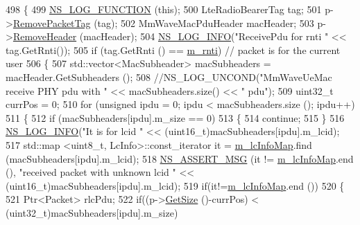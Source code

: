 \begin{DoxyCode}
498 \{
499         \hyperlink{log-macros-disabled_8h_a90b90d5bad1f39cb1b64923ea94c0761}{NS\_LOG\_FUNCTION} (\textcolor{keyword}{this});
500         LteRadioBearerTag tag;
501         p->\hyperlink{classns3_1_1Packet_a078fe922d976a417ab25ba2f3c2fd667}{RemovePacketTag} (tag);
502         MmWaveMacPduHeader macHeader;
503         p->\hyperlink{classns3_1_1Packet_a0961eccf975d75f902d40956c93ba63e}{RemoveHeader} (macHeader);
504   \hyperlink{group__logging_gafbd73ee2cf9f26b319f49086d8e860fb}{NS\_LOG\_INFO}(\textcolor{stringliteral}{"ReceivePdu for rnti "} << tag.GetRnti());
505         \textcolor{keywordflow}{if} (tag.GetRnti () == \hyperlink{classns3_1_1MmWaveUeMac_a73d6bc08e75e3a20c5fbaf3113cf40f5}{m\_rnti}) \textcolor{comment}{// packet is for the current user}
506         \{
507                 std::vector<MacSubheader> macSubheaders = macHeader.GetSubheaders ();
508                 \textcolor{comment}{//NS\_LOG\_UNCOND("MmWaveUeMac receive PHY pdu with " << macSubheaders.size() << " pdu");}
509                 uint32\_t currPos = 0;
510                 \textcolor{keywordflow}{for} (\textcolor{keywordtype}{unsigned} ipdu = 0; ipdu < macSubheaders.size (); ipdu++)
511                 \{
512                         \textcolor{keywordflow}{if} (macSubheaders[ipdu].m\_size == 0)
513                         \{
514                                 \textcolor{keywordflow}{continue};
515                         \}
516                         \hyperlink{group__logging_gafbd73ee2cf9f26b319f49086d8e860fb}{NS\_LOG\_INFO}(\textcolor{stringliteral}{"It is for lcid "} << (uint16\_t)macSubheaders[ipdu].m\_lcid);
517                         std::map <uint8\_t, LcInfo>::const\_iterator it = 
      \hyperlink{classns3_1_1MmWaveUeMac_a0797806054f43d23d0635440bcef7350}{m\_lcInfoMap}.find (macSubheaders[ipdu].m\_lcid);
518                         \hyperlink{assert_8h_aff5ece9066c74e681e74999856f08539}{NS\_ASSERT\_MSG} (it != \hyperlink{classns3_1_1MmWaveUeMac_a0797806054f43d23d0635440bcef7350}{m\_lcInfoMap}.end (), \textcolor{stringliteral}{"received packet
       with unknown lcid "} << (uint16\_t)macSubheaders[ipdu].m\_lcid);
519                         \textcolor{keywordflow}{if}(it!=\hyperlink{classns3_1_1MmWaveUeMac_a0797806054f43d23d0635440bcef7350}{m\_lcInfoMap}.end ())
520                         \{
521                                 Ptr<Packet> rlcPdu;
522                                 \textcolor{keywordflow}{if}((p->\hyperlink{classns3_1_1Packet_a462855c9929954d4301a4edfe55f4f1c}{GetSize} ()-currPos) < (uint32\_t)macSubheaders[ipdu].m\_size)

\end{DoxyCode}
